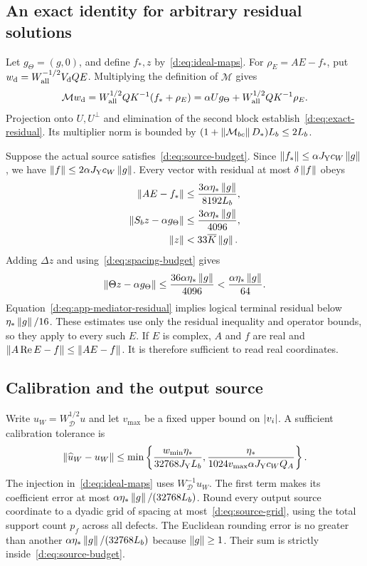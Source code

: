 \subsection{An exact identity for arbitrary residual solutions}

Let $g_\Theta=(g,0)$, and define $f_*,z$ by~\eqref{d:eq:ideal-maps}. For $\rho_E=AE-f_*$, put $w_{\rm d}=W_{\rm all}^{-1/2}V_{\rm d}QE$. Multiplying the definition of $\mathcal M$ gives
\[
 \mathcal Mw_{\rm d}=W_{\rm all}^{1/2}QK^{-1}(f_*+\rho_E)
 =\alpha Ug_\Theta+W_{\rm all}^{1/2}QK^{-1}\rho_E.
\]
Projection onto $U,U^\perp$ and elimination of the second block establish~\eqref{d:eq:exact-residual}. Its multiplier norm is bounded by $(1+\left\lVert \mathcal M_{bc}\right\rVert D_*)L_b\le2L_b$.

Suppose the actual source satisfies~\eqref{d:eq:source-budget}. Since $\left\lVert f_*\right\rVert\le\alpha J_{\rm Y}c_W\left\lVert g\right\rVert$, we have $\left\lVert f\right\rVert\le2\alpha J_{\rm Y}c_W\left\lVert g\right\rVert$. Every vector with residual at most $\delta\left\lVert f\right\rVert$ obeys
\begin{align*}
 \left\lVert AE-f_*\right\rVert&\le\frac{3\alpha\eta_*\left\lVert g\right\rVert}{8192L_b},\\
 \left\lVert S_bz-\alpha g_\Theta\right\rVert&\le\frac{3\alpha\eta_*\left\lVert g\right\rVert}{4096},\\
 \left\lVert z\right\rVert&<33\overline K \left\lVert g\right\rVert.
\end{align*}
Adding $\Delta z$ and using~\eqref{d:eq:spacing-budget} gives
\[
 \left\lVert \Theta z-\alpha g_\Theta\right\rVert\le\frac{36\alpha\eta_*\left\lVert g\right\rVert}{4096}
 <\frac{\alpha\eta_*\left\lVert g\right\rVert}{64}.
\]
Equation~\eqref{d:eq:app-mediator-residual} implies logical terminal residual below $\eta_*\left\lVert g\right\rVert/16$. These estimates use only the residual inequality and operator bounds, so they apply to every such $E$. If $E$ is complex, $A$ and $f$ are real and $\left\lVert A\operatorname{Re}E-f\right\rVert\le\left\lVert AE-f\right\rVert$. It is therefore sufficient to read real coordinates.

\subsection{Calibration and the output source}

Write $u_W=W_{\mathcal D}^{1/2}u$ and let $v_{\max}$ be a fixed upper bound on $\left\lvert v_i\right\rvert$. A sufficient calibration tolerance is
\begin{equation}\label{d:eq:app-q-calibration}
 \left\lVert \widehat u_W-u_W\right\rVert\le
 \min\left\{
 \frac{w_{\min}\eta_*}{32768J_{\rm Y}L_b},
 \frac{\eta_*}{1024v_{\max}\alpha J_{\rm Y}c_WQ_A}
 \right\}.
\end{equation}
The injection in~\eqref{d:eq:ideal-maps} uses $W_{\mathcal D}^{-1}u_W$. The first term makes its coefficient error at most $\alpha\eta_*\left\lVert g\right\rVert/(32768L_b)$. Round every output source coordinate to a dyadic grid of spacing at most~\eqref{d:eq:source-grid}, using the total support count $p_f$ across all defects. The Euclidean rounding error is no greater than another $\alpha\eta_*\left\lVert g\right\rVert/(32768L_b)$ because $\left\lVert g\right\rVert\ge1$. Their sum is strictly inside~\eqref{d:eq:source-budget}.

